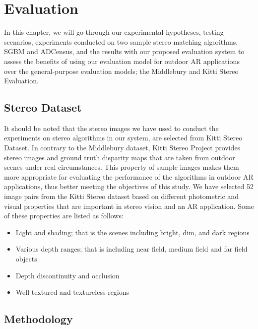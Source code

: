 \chapter{Evaluation}
\label{chap:Evaluation}
\renewcommand{\arraystretch}{0.5}

In this chapter, we will go through our experimental hypotheses, testing scenarios, experiments conducted on two sample 
stereo matching algorithms, SGBM and ADCensus, and the results with our
proposed evaluation system to assess the benefits of using our evaluation model for outdoor AR applications over the general-purpose evaluation models; 
the Middlebury and Kitti Stereo Evaluation.

\section{Stereo Dataset}
It should be noted that the stereo images we have used to conduct the experiments on stereo algorithms in our system,
are selected from Kitti Stereo Dataset.
In contrary to the Middlebury dataset, Kitti Stereo Project provides stereo images and ground truth disparity maps
that are taken from outdoor scenes under real circumstances. This property of sample images makes them more appropriate 
for evaluating the performance of the algorithms in outdoor AR applications, thus better meeting the objectives of this study.
We have selected 52 image pairs from the Kitti Stereo dataset based on different photometric and visual properties that are important
in stereo vision and an AR application. Some 
of these properties are listed as follows:
\begin{itemize}
\item Light and shading; that is the scenes including bright, dim, and dark regions
\item Various depth ranges; that is including near field, medium field and far field objects  
\item Depth discontinuity and occlusion
\item Well textured and textureless regions
\end{itemize}


\section{Methodology}

